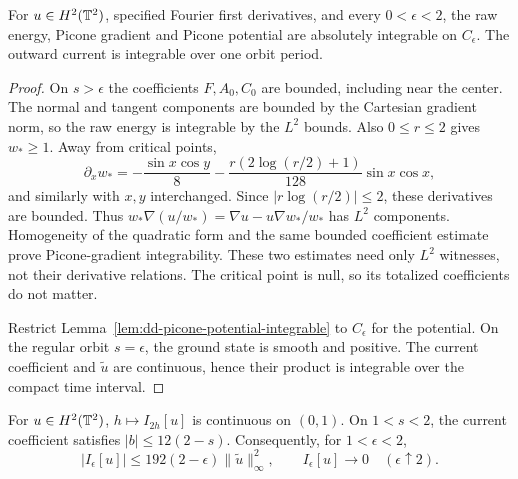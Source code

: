 \begin{lemma}
\label{lem:dd-truncated-picone-integrability}
\leanok
For $u\in H^2(\mathbb{T}^2)$, specified Fourier first derivatives, and every
$0<\epsilon<2$, the raw energy, Picone gradient and Picone potential
are absolutely integrable on $C_\epsilon$. The outward current is
integrable over one orbit period.
\end{lemma}

\begin{proof}
\leanok
On $s>\epsilon$ the coefficients $F,A_0,C_0$ are bounded, including
near the center. The normal and tangent components are bounded by the
Cartesian gradient norm, so the raw energy is integrable by the $L^2$
bounds. Also $0\le r\le2$ gives $w_*\ge1$. Away from critical points,
\[
 \partial_xw_*=-\frac{\sin x\cos y}{8}
   -\frac{r(2\log(r/2)+1)}{128}\sin x\cos x,
\]
and similarly with $x,y$ interchanged. Since
$|r\log(r/2)|\le2$, these derivatives are bounded.
Thus $w_*\nabla(u/w_*)=\nabla u-u\nabla w_*/w_*$ has $L^2$
components. Homogeneity of the quadratic form and the same bounded
coefficient estimate prove Picone-gradient integrability. These two
estimates need only $L^2$ witnesses, not their derivative relations.
The critical point is null, so its totalized coefficients do not matter.

Restrict Lemma~\ref{lem:dd-picone-potential-integrable} to $C_\epsilon$
for the potential. On the regular orbit $s=\epsilon$, the ground state
is smooth and positive. The current coefficient and $\widetilde u$
are continuous, hence their product is integrable over the compact
time interval.
\end{proof}

\begin{lemma}
\label{lem:dd-picone-current-regularity}
\leanok
For $u\in H^2(\mathbb{T}^2)$, $h\mapsto I_{2h}[u]$ is continuous on $(0,1)$.
On $1<s<2$, the current coefficient satisfies $|b|\le12(2-s)$.
Consequently, for $1<\epsilon<2$,
\[
 |I_\epsilon[u]|\le192(2-\epsilon)\|\widetilde u\|_\infty^2,
 \qquad I_\epsilon[u]\longrightarrow0\quad(\epsilon\uparrow2).
\]
\end{lemma}

